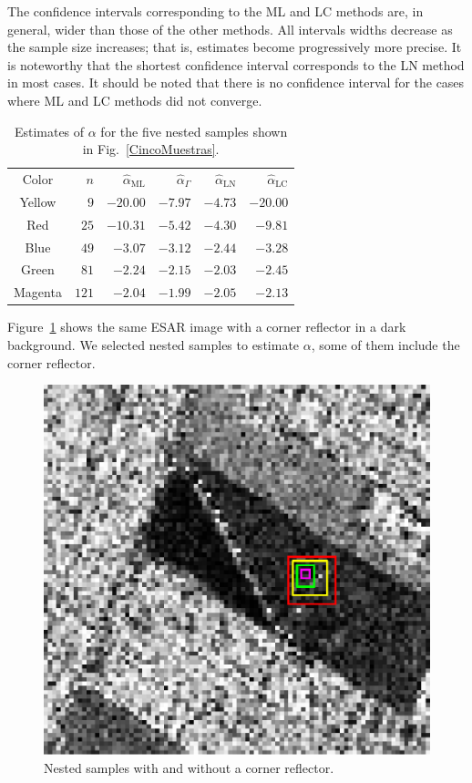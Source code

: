 \documentclass[twocolumn]{svjour3}
\begin{document}
	The confidence intervals corresponding to the ML and LC methods are, in general, wider than those of the other methods. 
	All intervals widths decrease as the sample size increases; that is, estimates become progressively more precise. 
	It is noteworthy that the shortest confidence interval corresponds to the LN method in most cases. 
	It should be noted that there is no confidence interval for the cases where ML and LC methods did not converge.
	
	\begin{table}[hbt]
		\centering
		\caption{Estimates of ${\alpha}$ for the five nested samples shown in Fig.~\ref{CincoMuestras}.}\label{TablaCincoMuestras} 
		\begin{tabular}{c*5{r}}
			\toprule
			Color       &  $n$    &  $\widehat{\alpha}_{\text{{ML}}}$    &  $\widehat{\alpha}_{\Gamma}$  &  $\widehat{\alpha}_{\text{{LN}}}$ &  $\widehat{\alpha}_{\text{{LC}}}$\\
			\cmidrule(lr){1-6}
			Yellow      & $9$     & $-20.00$      & $-7.97$ & $-4.73$ & $-20.00$\\
			Red         & $25$    & $-10.31$  & $-5.42$ & $-4.30$ & $-9.81$\\
			Blue        & $49$    & $-3.07$   & $-3.12$ & $-2.44$ & $-3.28$\\
			Green       & $81$    & $-2.24$   & $-2.15$ & $-2.03$ & $-2.45$\\
			Magenta     & $121$   & $-2.04$   & $-1.99$ & $-2.05$ & $-2.13$\\
			\bottomrule
		\end{tabular}
	\end{table}
	
	Figure~\ref{CornerReflector} shows the same ESAR image with a corner reflector in a dark background. 
	We selected nested samples to estimate $\alpha$, some of them include the corner reflector.
	
	\begin{figure}[hbt]
		\centering
		\includegraphics[width=0.7\linewidth]{../../../Figures/PaperTesis/CornerJulia_Roja.eps}
		\caption{Nested samples with and without a corner reflector.}\label{CornerReflector}
	\end{figure}
	
\end{document}

